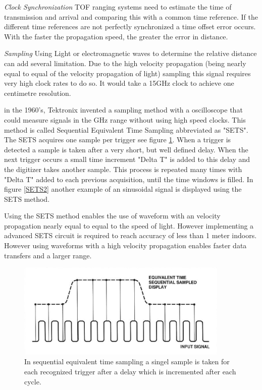 \documentclass[10pt,a4paper]{article}
\begin{document}
\textit{Clock Synchronization}
TOF ranging systems need to estimate the time of transmission and arrival and comparing this with a common time reference.\cite{TOF} If the different time references are not perfectly synchronized a time offset error occurs. With the faster the propagation speed, the greater the error in distance. 

\textit{Sampling}
Using Light or electromagnetic waves to determine the relative distance can add several limitation. Due to the high velocity propagation (being nearly equal to equal of the velocity propagation of light) sampling this signal requires very high clock rates to do so. It would take a 15GHz clock to achieve one centimetre resolution.\cite{Arduino}

in the 1960's, Tektronix invented a sampling method with a oscilloscope that could measure signals in the GHz range without using high speed clocks. This method is called Sequential Equivalent Time Sampling abbreviated as "SETS". The SETS acquires one sample per trigger see figure \ref{SETS}. When a trigger is detected a sample is taken after a very short, but well defined delay. When the next trigger occurs a small time increment "Delta T" is added to this delay and the digitizer takes another sample. This process is repeated many times with "Delta T" added to each previous acquisition, until the time windows is filled.\cite{SETS} In figure \ref{SETS2} another example of an sinusoidal signal is displayed using the SETS method. 

Using the SETS method enables the use of waveform with an velocity propagation nearly equal to equal to the speed of light. However implementing a advanced SETS circuit is required to reach accuracy of less than 1 meter indoors.\cite{TOF} However using waveforms with a high velocity propagation enables faster data transfers and a larger range.\cite{TOF}

\begin{figure}[H]
\centering
\includegraphics[width=0.9\textwidth]{SETS.png}
\caption{In sequential equivalent time sampling a singel sample is taken for each recognized trigger after a delay which is incremented after each cycle.\cite{SETS}} 
\label{SETS}
\end{figure}
\end{document}
